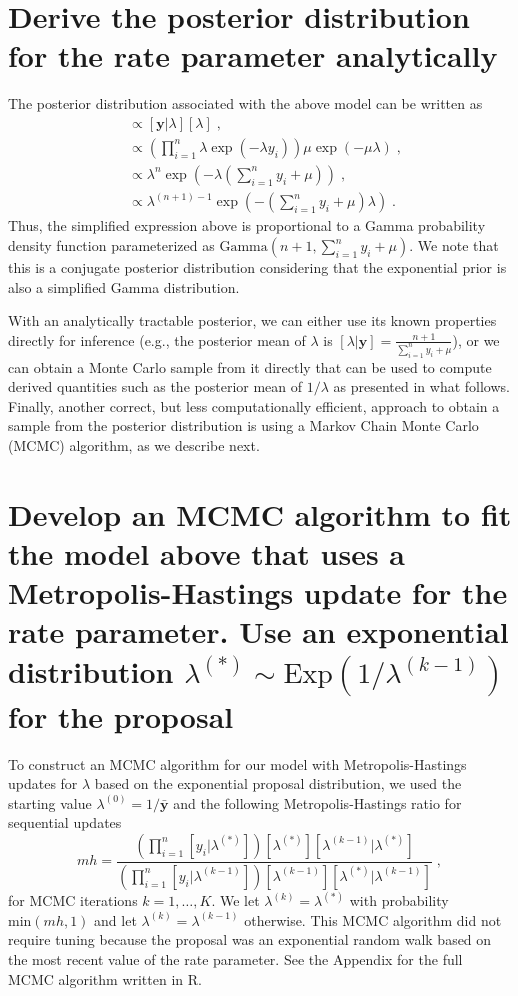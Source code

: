\documentclass[12pt]{article} \topmargin=.1in \oddsidemargin=.25in
\begin{document}
\section{Derive the posterior distribution for the rate parameter analytically}
The posterior distribution associated with the above model can be written as
\begin{align}
  [\lambda|\mathbf{y}]&\propto [\mathbf{y}|\lambda][\lambda] \;, \\
  &\propto \left(\prod_{i=1}^n \lambda \exp(-\lambda y_i)\right)\mu\exp(-\mu\lambda) \;, \\
  &\propto \lambda^n \exp\left(-\lambda\left(\sum_{i=1}^n y_i+\mu\right)\right) \;, \\
  &\propto \lambda^{(n+1)-1} \exp\left(-\left(\sum_{i=1}^n y_i+\mu\right)\lambda\right) \;.
\end{align}
\noindent Thus, the simplified expression above is proportional to a Gamma probability density function parameterized as $\text{Gamma}(n+1,\sum_{i=1}^n y_i + \mu)$.  We note that this is a conjugate posterior distribution considering that the exponential prior is also a simplified Gamma distribution.  

With an analytically tractable posterior, we can either use its known properties directly for inference (e.g., the posterior mean of $\lambda$ is $[\lambda|\mathbf{y}]=\frac{n+1}{\sum_{i=1}^n y_i+\mu}$), or we can obtain a Monte Carlo sample from it directly that can be used to compute derived quantities such as the posterior mean of $1/\lambda$ as presented in what follows.  Finally, another correct, but less computationally efficient, approach to obtain a sample from the posterior distribution is using a Markov Chain Monte Carlo (MCMC) algorithm, as we describe next.     

\section{Develop an MCMC algorithm to fit the model above that uses a Metropolis-Hastings update for the rate parameter.  Use an exponential distribution $\lambda^{(*)} \sim \text{Exp}(1/\lambda^{(k-1)})$ for the proposal}

To construct an MCMC algorithm for our model with Metropolis-Hastings updates for $\lambda$ based on the exponential proposal distribution, we used the starting value $\lambda^{(0)}=1/\bar{\mathbf{y}}$ and the following Metropolis-Hastings ratio for sequential updates
\begin{equation}
  mh=\frac{\left( \prod_{i=1}^n [y_i|\lambda^{(*)}]\right)[\lambda^{(*)}][\lambda^{(k-1)}|\lambda^{(*)}]}{\left(\prod_{i=1}^n [y_i|\lambda^{(k-1)}]\right)[\lambda^{(k-1)}][\lambda^{(*)}|\lambda^{(k-1)}]} \;,
\end{equation}
\noindent for MCMC iterations $k=1,\ldots,K$.  We let $\lambda^{(k)}=\lambda^{(*)}$ with probability $\text{min}(mh,1)$ and let $\lambda^{(k)}=\lambda^{(k-1)}$ otherwise.  This MCMC algorithm did not require tuning because the proposal was an exponential random walk based on the most recent value of the rate parameter.  See the Appendix for the full MCMC algorithm written in R.  
\end{document}
